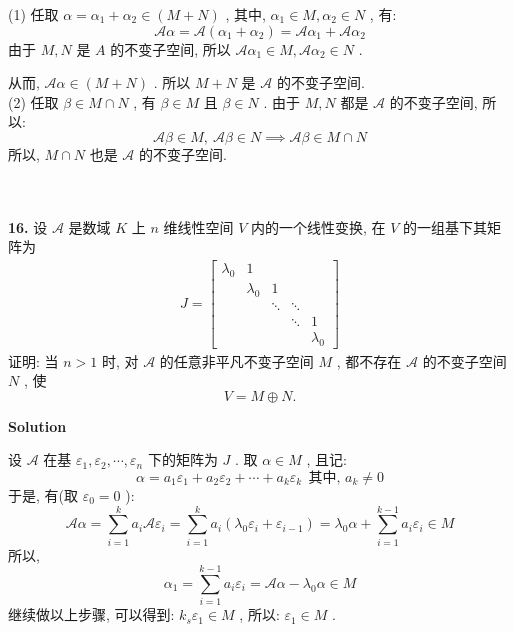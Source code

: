 \documentclass[11pt,a4paper,openany,oneside]{book}
\newcommand\Solution{\noindent\textbf{\textsf{Solution}}\par\medskip}
\begin{document}
(1) 任取 $ \alpha = \alpha_1 + \alpha_2 \in (M + N) $ , 其中,  $ \alpha_1 \in M, \alpha_2 \in N $ , 有:
 $$ \mathcal{A}\alpha = \mathcal{A}(\alpha_1 + \alpha_2) = \mathcal{A}\alpha_1 + \mathcal{A}\alpha_2 $$ 
由于 $ M, N $ 是 $ A $ 的不变子空间, 所以 $ \mathcal{A}\alpha_1 \in M , \mathcal{A}\alpha_2 \in N $ .

从而,  $ \mathcal{A}\alpha \in (M+N) $ . 所以 $ M+N $ 是 $ \mathcal{A} $ 的不变子空间. \\

(2) 任取 $ \beta \in M \cap N $ , 有 $ \beta \in M $ 且 $ \beta \in N $ . 由于 $ M, N $ 都是 $ \mathcal{A} $ 的不变子空间, 所以:
 $$  \mathcal{A}\beta \in M, \  \mathcal{A}\beta \in N \implies \mathcal{A}\beta \in M \cap N  $$ 
所以,  $ M \cap N $ 也是 $ \mathcal{A} $ 的不变子空间.  \\  \\  \\ 



\begin{myexample}
	\textbf{16.} 设 $ \mathcal{A} $ 是数域 $ K $ 上 $ n $ 维线性空间 $ V $ 内的一个线性变换, 在 $ V $ 的一组基下其矩阵为
\begin{gather*}
J =
\begin{bmatrix}
\lambda_0  &  1  &   &    &     \\
&  \lambda_0  &  1  &    &   \\
&         &   \ddots & \ddots &  \\
&      &        &  \ddots  &  1  \\
&    &        &          &   \lambda_0 
\end{bmatrix}
\end{gather*}
证明: 当 $ n>1 $ 时, 对 $ \mathcal{A} $ 的任意非平凡不变子空间 $ M $ , 都不存在 $ \mathcal{A} $ 的不变子空间 $ N $ , 使
 $$  V = M \oplus  N . $$ 

\end{myexample}
\Solution  

设 $ \mathcal{A} $ 在基 $ \varepsilon_1, \varepsilon_2, \cdots, \varepsilon_n $ 下的矩阵为 $ J $ . 取 $ \alpha \in M $ , 且记:
 $$  \alpha = a_1\varepsilon_1 + a_2\varepsilon_2 + \cdots + a_k\varepsilon_k \ \ \text{其中, }a_k \neq 0  $$ 
于是, 有(取 $ \varepsilon_0 = 0 $ ):
 $$  \mathcal{A}\alpha = \sum\limits_{i=1}^k a_i \mathcal{A}\varepsilon_i = \sum\limits_{i=1}^k a_i(\lambda_0 \varepsilon_i + \varepsilon_{i-1}) = \lambda_0 \alpha + \sum\limits_{i=1}^{k-1}a_i\varepsilon_i \in M  $$ 
所以,
 $$  \alpha_1 = \sum\limits_{i=1}^{k-1} a_i\varepsilon_i = \mathcal{A}\alpha - \lambda_0 \alpha \in M   $$ 
继续做以上步骤, 可以得到:  $ k_s \varepsilon_1 \in M $ , 所以: $ \varepsilon_1 \in M $ .
\end{document}
